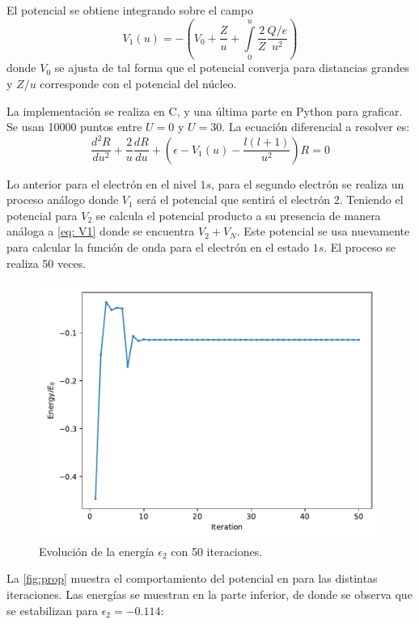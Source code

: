 \documentclass[paper=letter, fontsize=11pt]{scrartcl}
\begin{document}
El potencial se obtiene integrando sobre el campo
\begin{equation}\label{eq: V1}
	V_{1}(u) = -\left(V_0 + \dfrac{Z}{u} +  \int\limits_{0}^{u}\dfrac{2}{Z}\dfrac{Q/e}{u^2}\right)
\end{equation}
donde $V_0$ se ajusta de tal forma que el potencial converja para distancias grandes y $Z/u$ corresponde con el potencial del n\'ucleo.

La implementaci\'on se realiza en C, y una \'ultima parte en Python para graficar. Se usan 10000 puntos entre $U=0$ y $U=30$. La ecuaci\'on diferencial a resolver es:
\begin{equation}
	\dfrac{d^2R}{du^2} + \dfrac{2}{u}\dfrac{dR}{du} + \left(\epsilon -V_{1}(u) - \dfrac{l(l+1)}{u^2}\right)R = 0
\end{equation}

Lo anterior para el electr\'on en el nivel $1s$, para el segundo electr\'on se realiza un proceso an\'alogo donde $V_1$
ser\'a el potencial que sentir\'a el electr\'on 2. Teniendo el potencial para $V_2$ se calcula el potencial producto a su presencia de manera an\'aloga a \autoref{eq: V1} donde se encuentra $V_2 + V_N$. Este potencial se usa nuevamente para calcular la funci\'on de onda para el electr\'on en el estado $1s$. El proceso se realiza 50 veces.




\begin{figure}[!ht]
	\centering
	\includegraphics[width=0.6\linewidth]{change.pdf}
	\caption{Evoluci\'on de la energ\'ia $\epsilon_2$ con 50 iteraciones.}
	\label{fig:prop}
\end{figure}

La \autoref{fig:prop} muestra el comportamiento del potencial en para las distintas iteraciones. Las energ\'ias se muestran en la parte inferior, de donde se observa que se estabilizan para $\epsilon_2=-0.114$:
\end{document}
